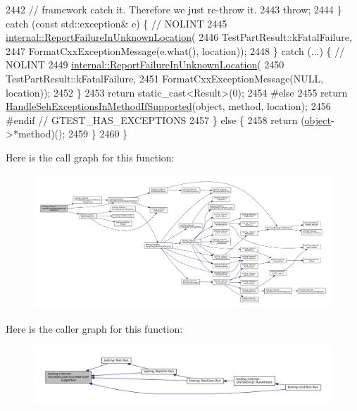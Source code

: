\begin{DoxyCode}
2442       \textcolor{comment}{// framework catch it.  Therefore we just re-throw it.}
2443       \textcolor{keywordflow}{throw};
2444     \} \textcolor{keywordflow}{catch} (\textcolor{keyword}{const} std::exception& e) \{  \textcolor{comment}{// NOLINT}
2445       \hyperlink{namespacetesting_1_1internal_a85f6ff0e40f9a5f10af66a73cf1364fa}{internal::ReportFailureInUnknownLocation}(
2446           TestPartResult::kFatalFailure,
2447           FormatCxxExceptionMessage(e.what(), location));
2448     \} \textcolor{keywordflow}{catch} (...) \{  \textcolor{comment}{// NOLINT}
2449       \hyperlink{namespacetesting_1_1internal_a85f6ff0e40f9a5f10af66a73cf1364fa}{internal::ReportFailureInUnknownLocation}(
2450           TestPartResult::kFatalFailure,
2451           FormatCxxExceptionMessage(NULL, location));
2452     \}
2453     \textcolor{keywordflow}{return} \textcolor{keyword}{static\_cast<}Result\textcolor{keyword}{>}(0);
2454 \textcolor{preprocessor}{#else}
2455     \textcolor{keywordflow}{return} \hyperlink{namespacetesting_1_1internal_ac5293b438139ef7ed05cb7fcaaf63545}{HandleSehExceptionsInMethodIfSupported}(\textcolor{keywordtype}{object}, method, 
      location);
2456 \textcolor{preprocessor}{#endif  // GTEST\_HAS\_EXCEPTIONS}
2457   \} \textcolor{keywordflow}{else} \{
2458     \textcolor{keywordflow}{return} (\hyperlink{classobject}{object}->*method)();
2459   \}
2460 \}
\end{DoxyCode}
Here is the call graph for this function\+:
\nopagebreak
\begin{figure}[H]
\begin{center}
\leavevmode
\includegraphics[width=350pt]{namespacetesting_1_1internal_addb2ed165b92b74e25fe9ebe9e46b9f9_cgraph}
\end{center}
\end{figure}
Here is the caller graph for this function\+:
\nopagebreak
\begin{figure}[H]
\begin{center}
\leavevmode
\includegraphics[width=350pt]{namespacetesting_1_1internal_addb2ed165b92b74e25fe9ebe9e46b9f9_icgraph}
\end{center}
\end{figure}

